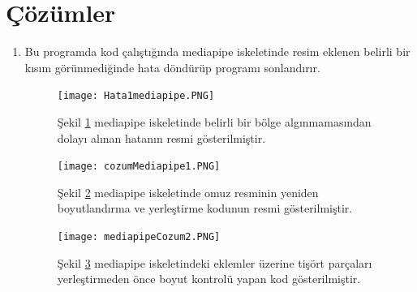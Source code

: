 \documentclass[12pt, a4paper]{article}
\begin{document}
\section{Çözümler}
\begin{enumerate}
	\item Bu programda kod çalıştığında mediapipe iskeletinde resim eklenen belirli bir kısım görünmediğinde hata döndürüp programı sonlandırır.
	
	\begin{figure}[!ht]
		\caption{}
		\centering
		\texttt{[image: Hata1mediapipe.PNG]}
		\label{mediapipeHata1}
		
		
		Şekil \ref{mediapipeHata1} mediapipe iskeletinde belirli bir bölge algınmamasından dolayı alınan hatanın resmi gösterilmiştir.	
		
		
		
	\end{figure}
	\begin{figure}[!ht]
		\caption{}
		\centering
		\texttt{[image: cozumMediapipe1.PNG]}
		\label{mediapipeCozum1}
		
		
		Şekil \ref{mediapipeCozum1} mediapipe iskeletinde omuz resminin yeniden boyutlandırma ve yerleştirme kodunun  resmi gösterilmiştir.	
		
		
		
	\end{figure}
	\begin{figure}[!ht]
		\caption{}
		\centering
		\texttt{[image: mediapipeCozum2.PNG]}
		\label{mediapipeCozum2}
		
		
		Şekil \ref{mediapipeCozum2} mediapipe iskeletindeki eklemler üzerine tişört parçaları  yerleştirmeden önce boyut kontrolü yapan kod gösterilmiştir.	
		
		
		

\end{figure}
\end{enumerate}
\end{document}
